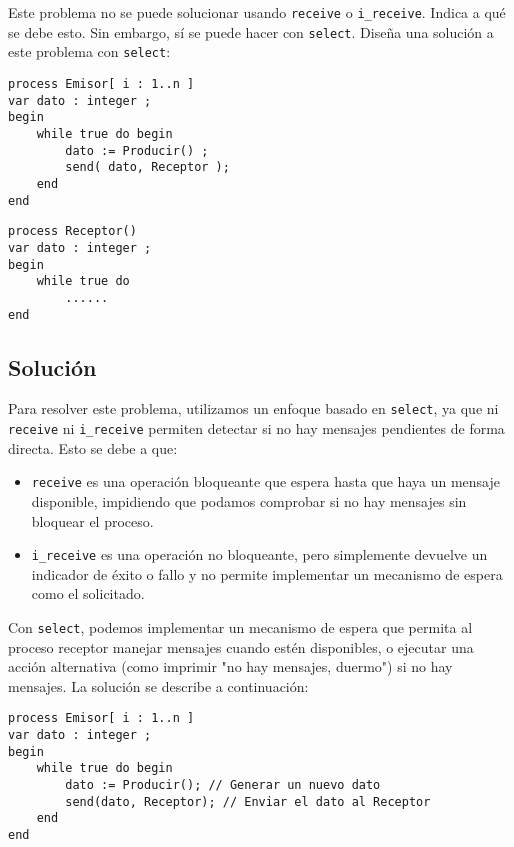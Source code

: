\documentclass[a4paper,12pt]{article}
\begin{document}
Este problema no se puede solucionar usando \texttt{receive} o \texttt{i\_receive}. Indica a qué se debe esto. Sin embargo, sí se puede hacer con \texttt{select}. Diseña una solución a este problema con \texttt{select}:

\begin{lstlisting}[style=customcpp]
process Emisor[ i : 1..n ]
var dato : integer ;
begin
    while true do begin
        dato := Producir() ;
        send( dato, Receptor );
    end
end
\end{lstlisting}

\begin{lstlisting}[style=customcpp]
process Receptor()
var dato : integer ;
begin
    while true do
        ......
end
\end{lstlisting}


\subsection{Solución}

Para resolver este problema, utilizamos un enfoque basado en \texttt{select}, ya que ni \texttt{receive} ni \texttt{i\_receive} permiten detectar si no hay mensajes pendientes de forma directa. Esto se debe a que:

\begin{itemize}
    \item \texttt{receive} es una operación bloqueante que espera hasta que haya un mensaje disponible, impidiendo que podamos comprobar si no hay mensajes sin bloquear el proceso.
    \item \texttt{i\_receive} es una operación no bloqueante, pero simplemente devuelve un indicador de éxito o fallo y no permite implementar un mecanismo de espera como el solicitado.
\end{itemize}

Con \texttt{select}, podemos implementar un mecanismo de espera que permita al proceso receptor manejar mensajes cuando estén disponibles, o ejecutar una acción alternativa (como imprimir "no hay mensajes, duermo") si no hay mensajes. La solución se describe a continuación:

\begin{lstlisting}[style=customcpp]
process Emisor[ i : 1..n ]
var dato : integer ;
begin
    while true do begin
        dato := Producir(); // Generar un nuevo dato
        send(dato, Receptor); // Enviar el dato al Receptor
    end
end
\end{lstlisting}
\end{document}
